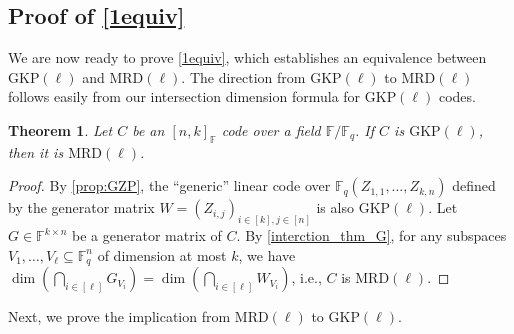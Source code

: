 \documentclass[11pt]{article}
\theoremstyle{plain}
\newtheorem{thm}{Theorem}[section]
\theoremstyle{definition}
\theoremstyle{remark}
\newcommand{\F}{\mathbb{F}}
\begin{document}
\subsection{Proof of \cref{1equiv}}

We are now ready to prove \cref{1equiv}, which establishes an equivalence between $\mathrm{GKP}(\ell)$ and $\mathrm{MRD}(\ell)$. The direction from $\mathrm{GKP}(\ell)$ to $\mathrm{MRD}(\ell)$ follows easily from our intersection dimension formula for  $\mathrm{GKP}(\ell)$ codes.

\begin{thm}\label{thm:gkp2mrd}
Let $C$ be an $[n,k]_{\F}$ code over a field $\F/\F_q$.
If $C$ is $\mathrm{GKP}(\ell)$, then it is $\mathrm{MRD}(\ell)$.
\end{thm}
\begin{proof}
By \cref{prop:GZP}, the ``generic'' linear code over $\F_q(Z_{1,1},\dots,Z_{k,n})$ defined by the generator matrix $W=(Z_{i,j})_{i\in [k], j\in [n]}$ is also $\mathrm{GKP}(\ell)$.
Let $G\in \F^{k\times n}$ be a generator matrix of $C$.
By \cref{interction_thm_G}, for any subspaces $V_1,\dots,V_\ell\subseteq \F_q^n$ of dimension at most $k$, we have $\dim(\bigcap_{i\in [\ell]} G_{V_i})=\dim(\bigcap_{i\in [\ell]} W_{V_i})$, i.e., $C$ is $\mathrm{MRD}(\ell)$.
\end{proof}

Next, we prove the implication from $\mathrm{MRD}(\ell)$ to $\mathrm{GKP}(\ell)$.
\end{document}
